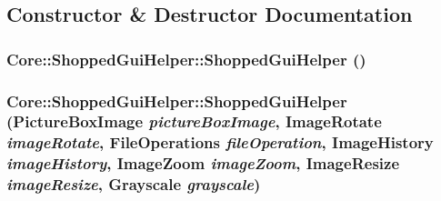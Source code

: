 \subsection{Constructor \& Destructor Documentation}
\hypertarget{class_core_1_1_shopped_gui_helper_a97f481d806becab3321f15c88e213da2}{
\subsubsection[{ShoppedGuiHelper}]{\setlength{\rightskip}{0pt plus 5cm}Core::ShoppedGuiHelper::ShoppedGuiHelper ()}}
\label{class_core_1_1_shopped_gui_helper_a97f481d806becab3321f15c88e213da2}
\hypertarget{class_core_1_1_shopped_gui_helper_ad0f25ffda7396726346d265f203d9d14}{
\subsubsection[{ShoppedGuiHelper}]{\setlength{\rightskip}{0pt plus 5cm}Core::ShoppedGuiHelper::ShoppedGuiHelper ({\bf PictureBoxImage} {\em pictureBoxImage}, \/  {\bf ImageRotate} {\em imageRotate}, \/  {\bf FileOperations} {\em fileOperation}, \/  {\bf ImageHistory} {\em imageHistory}, \/  {\bf ImageZoom} {\em imageZoom}, \/  {\bf ImageResize} {\em imageResize}, \/  {\bf Grayscale} {\em grayscale})}}
\label{class_core_1_1_shopped_gui_helper_ad0f25ffda7396726346d265f203d9d14}


